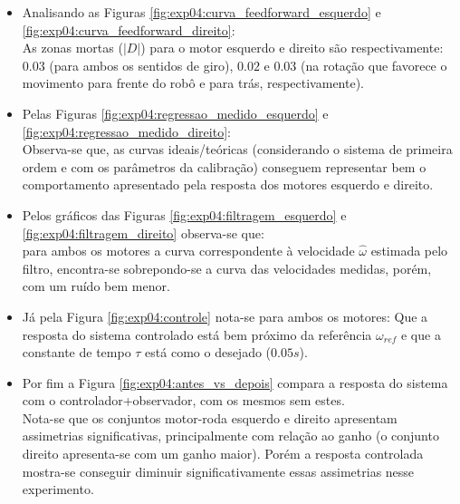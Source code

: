\begin{itemize}
    \item Analisando as Figuras \ref{fig:exp04:curva_feedforward_esquerdo} e \ref{fig:exp04:curva_feedforward_direito}:\\
        As zonas mortas ($|D|$) para o motor esquerdo e direito são respectivamente: $0.03$ (para ambos os sentidos de giro), $0.02$ e $0.03$ (na rotação que favorece o movimento para frente do robô e para trás, respectivamente).
    \item Pelas Figuras \ref{fig:exp04:regressao_medido_esquerdo} e \ref{fig:exp04:regressao_medido_direito}:\\
        Observa-se que, as curvas ideais/teóricas (considerando o sistema de primeira ordem e com os parâmetros da calibração) conseguem representar bem o comportamento apresentado pela resposta dos motores esquerdo e direito.
    \item Pelos gráficos das Figuras \ref{fig:exp04:filtragem_esquerdo} e \ref{fig:exp04:filtragem_direito} observa-se que:\\
        para ambos os motores a curva correspondente à velocidade $\hat{\omega}$ estimada pelo filtro, encontra-se sobrepondo-se a curva das velocidades medidas, porém, com um ruído bem menor.
    \item Já pela Figura \ref{fig:exp04:controle} nota-se para ambos os motores:
        Que a resposta do sistema controlado está bem próximo da referência $\omega_{ref}$ e que a constante de tempo $\tau$ está como o desejado ($0.05s$).
    \item Por fim a Figura \ref{fig:exp04:antes_vs_depois} compara a resposta do sistema com o controlador+observador, com os mesmos sem estes. \\
        Nota-se que os conjuntos motor-roda esquerdo e direito apresentam assimetrias significativas, principalmente com relação ao  ganho (o conjunto direito apresenta-se com um ganho maior). Porém a resposta controlada mostra-se conseguir diminuir significativamente essas assimetrias nesse experimento.
\end{itemize}